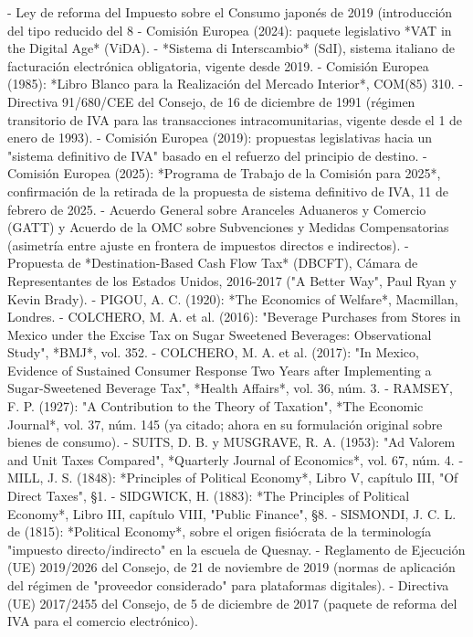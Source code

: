 \documentclass[10pt,a4paper]{article}
\begin{document}
- Ley de reforma del Impuesto sobre el Consumo japonés de 2019 (introducción del tipo reducido del 8%
- Comisión Europea (2024): paquete legislativo *VAT in the Digital Age* (ViDA).
- *Sistema di Interscambio* (SdI), sistema italiano de facturación electrónica obligatoria, vigente desde 2019.
- Comisión Europea (1985): *Libro Blanco para la Realización del Mercado Interior*, COM(85) 310.
- Directiva 91/680/CEE del Consejo, de 16 de diciembre de 1991 (régimen transitorio de IVA para las transacciones intracomunitarias, vigente desde el 1 de enero de 1993).
- Comisión Europea (2019): propuestas legislativas hacia un "sistema definitivo de IVA" basado en el refuerzo del principio de destino.
- Comisión Europea (2025): *Programa de Trabajo de la Comisión para 2025*, confirmación de la retirada de la propuesta de sistema definitivo de IVA, 11 de febrero de 2025.
- Acuerdo General sobre Aranceles Aduaneros y Comercio (GATT) y Acuerdo de la OMC sobre Subvenciones y Medidas Compensatorias (asimetría entre ajuste en frontera de impuestos directos e indirectos).
- Propuesta de *Destination-Based Cash Flow Tax* (DBCFT), Cámara de Representantes de los Estados Unidos, 2016-2017 ("A Better Way", Paul Ryan y Kevin Brady).
- PIGOU, A. C. (1920): *The Economics of Welfare*, Macmillan, Londres.
- COLCHERO, M. A. et al. (2016): "Beverage Purchases from Stores in Mexico under the Excise Tax on Sugar Sweetened Beverages: Observational Study", *BMJ*, vol. 352.
- COLCHERO, M. A. et al. (2017): "In Mexico, Evidence of Sustained Consumer Response Two Years after Implementing a Sugar-Sweetened Beverage Tax", *Health Affairs*, vol. 36, núm. 3.
- RAMSEY, F. P. (1927): "A Contribution to the Theory of Taxation", *The Economic Journal*, vol. 37, núm. 145 (ya citado; ahora en su formulación original sobre bienes de consumo).
- SUITS, D. B. y MUSGRAVE, R. A. (1953): "Ad Valorem and Unit Taxes Compared", *Quarterly Journal of Economics*, vol. 67, núm. 4.
- MILL, J. S. (1848): *Principles of Political Economy*, Libro V, capítulo III, "Of Direct Taxes", §1.
- SIDGWICK, H. (1883): *The Principles of Political Economy*, Libro III, capítulo VIII, "Public Finance", §8.
- SISMONDI, J. C. L. de (1815): *Political Economy*, sobre el origen fisiócrata de la terminología "impuesto directo/indirecto" en la escuela de Quesnay.
- Reglamento de Ejecución (UE) 2019/2026 del Consejo, de 21 de noviembre de 2019 (normas de aplicación del régimen de "proveedor considerado" para plataformas digitales).
- Directiva (UE) 2017/2455 del Consejo, de 5 de diciembre de 2017 (paquete de reforma del IVA para el comercio electrónico).
\end{document}
